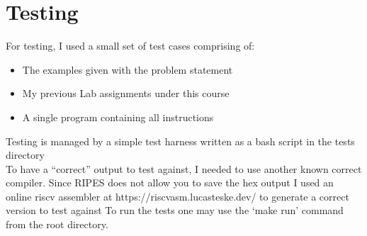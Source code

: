 \documentclass[12pt]{article}
\begin{document}
	\section{Testing}
	For testing, I used a small set of test cases comprising of:
	\begin{itemize}
		\item{The examples given with the problem statement}
		\item{My previous Lab assignments under this course}
		\item{A single program containing all instructions}
	\end{itemize}
	Testing is managed by a simple test harness written as a bash script in the tests directory\\
	To have a ``correct'' output to test against, I needed to use another known correct compiler. Since RIPES does not allow you to save the hex output I used an online riscv assembler at https://riscvasm.lucasteske.dev/ to generate a correct version to test against
	To run the tests one may use the `make run' command from the root directory.
\end{document}
